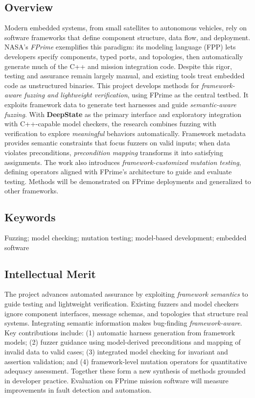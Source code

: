 \documentclass[11pt]{article}
\begin{document}
\begin{center}
{\large\sf\textbf{\proptitle}}
\end{center}

\subsection*{Overview}

Modern embedded systems, from small satellites to autonomous vehicles, rely on software frameworks that define component structure, data flow, and deployment. NASA’s \emph{FPrime} exemplifies this paradigm: its modeling language (FPP) lets developers specify components, typed ports, and topologies, then automatically generate much of the C++ and mission integration code. Despite this rigor, testing and assurance remain largely manual, and existing tools treat embedded code as unstructured binaries.  This project develops methods for \emph{framework-aware fuzzing and lightweight verification}, using FPrime as the central testbed. It exploits framework data to generate test harnesses and guide \emph{semantic-aware fuzzing}. With \textbf{DeepState} as the primary interface and exploratory integration with C++-capable model checkers, the research combines fuzzing with verification to explore \emph{meaningful} behaviors automatically. Framework metadata provides semantic constraints that focus fuzzers on valid inputs; when data violates preconditions, \emph{precondition mapping} transforms it into satisfying assignments.
The work also introduces \emph{framework-customized mutation testing}, defining operators aligned with FPrime’s architecture to guide and evaluate testing. Methods will be demonstrated on FPrime deployments and generalized to other frameworks.

\subsection*{Keywords}

Fuzzing; model checking; mutation testing; model-based development; embedded software

\subsection*{Intellectual Merit}

The project advances automated assurance by exploiting \emph{framework semantics} to guide testing and lightweight verification. Existing fuzzers and model checkers ignore component interfaces, message schemas, and topologies that structure real systems. Integrating semantic information makes bug-finding \emph{framework-aware}.
Key contributions include: (1) automatic harness generation from framework models; (2) fuzzer guidance using model-derived preconditions and mapping of invalid data to valid cases; (3) integrated model checking for invariant and assertion validation; and (4) framework-level mutation operators for quantitative adequacy assessment. Together these form a new synthesis of methods grounded in developer practice. Evaluation on FPrime mission software will measure improvements in fault detection and automation.
\end{document}
